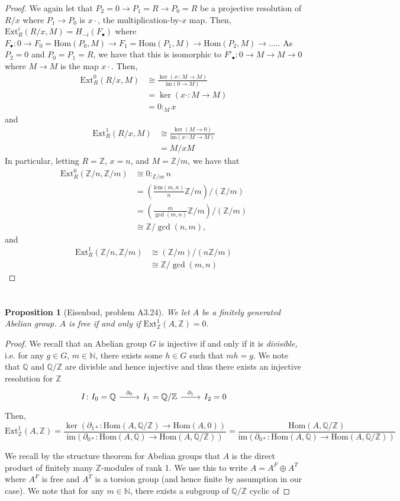 \documentclass[english]{article}
\newcommand{\NN}{\mathbb{N}}
\newcommand{\ZZ}{\mathbb{Z}}
\newcommand{\QQ}{\mathbb{Q}}
\newcommand{\prob}[1]{\setcounter{section}{#1-1}\section{}}
\newtheorem*{prop*}{Proposition}
\theoremstyle{remark}
\theoremstyle{definition}
\newcommand{\lcm}{\mathrm{lcm}}
\renewcommand{\hom}{\mathrm{Hom}}
\newcommand{\im}{\mathrm{im}}
\newcommand{\ext}{\mathrm{Ext}}
\newcommand{\col}[3]{{#1}:_{#2}{#3}}
\newcommand{\del}{\partial}
\begin{document}
\begin{proof}
	We again let that $P_2=0\to P_1=R\to P_0=R$ be a projective resolution of $R/x$ where $P_1\to P_0$ is $x\cdot$, the multiplication-by-$x$ map. Then, $\ext^i_R(R/x,M)=H_{-i}(F_\bullet)$ where $F_\bullet\colon0\to F_0=\hom(P_0,M)\to F_1=\hom(P_1,M)\to \hom(P_2,M)\to\hdots.$. As $P_2=0$ and $P_0=P_1=R$, we have that this is isomorphic to $F'_\bullet\colon0\to M\to M\to 0$ where $M\to M$ is the map $x\cdot$. Then, \begin{align*}\ext_R^0(R/x,M)&\cong\frac{\ker(x\cdot:M\to M)}{\im(0\to M)}\\&=\ker (x\cdot:M\to M)\\&= \col{0}{M}{x}\end{align*}
	and \begin{align*}
	\ext^1_R(R/x,M)&\cong \frac{\ker(M\to 0)}{\im(x\cdot:M\to M)}\\&=M/xM
	\end{align*}
	In particular, letting $R=\ZZ$, $x=n$, and $M=\ZZ/m$, we have that \begin{align*}
\ext_R^0(\ZZ/n,\ZZ/m)&\cong\col{0}{\ZZ/m}{n}\\&=\left(\frac{\lcm(m,n)}{n}\ZZ/m\right)/\left(\ZZ/m\right)\\&=\left(\frac{m}{\gcd(m,n)}\ZZ/m\right)/\left(\ZZ/m\right)\\&\cong \ZZ/\gcd(n,m),	\end{align*} and \begin{align*}
	\ext_R^1(\ZZ/n,\ZZ/m)&\cong (\ZZ/m)/\left(n\ZZ/m\right)\\&\cong \ZZ/\gcd(m,n)
\end{align*}
\end{proof}
%
%
%
\prob{34}\begin{prop*}[Eisenbud, problem A3.24]
	We let $A$ be a finitely generated Abelian group. $A$ is free if and only if $\ext_\ZZ^1(A,\ZZ)=0$.
\end{prop*}
\begin{proof}
We recall that an Abelian group $G$ is injective if and only if it is \textit{divisible,} i.e. for any $g\in G$, $m\in \NN$, there exists some $h\in G$ such that $mh=g$. We note that $\QQ$ and $\QQ/\ZZ$ are divisble and hence injective and thus there exists an injective resolution for $\ZZ$ \begin{equation*}
\begin{tikzcd}
	I\colon I_0=\QQ\arrow[r,"\del_0"]& I_1=\QQ/\ZZ\arrow[r,"\del_1"]&I_2=0\end{tikzcd}
\end{equation*}
Then, $$\ext^1_\ZZ(A,\ZZ)=\frac{\ker\left(\del_{1*}:\hom(A,\QQ/\ZZ)\to\hom(A,0)\right)}{\im\left(\del_{0*}:\hom(A,\QQ)\to\hom(A,\QQ/\ZZ)\right)}=\frac{\hom(A,\QQ/\ZZ)}{\im\left(\del_{0*}:\hom(A,\QQ)\to\hom(A,\QQ/\ZZ)\right)}$$

We recall by the structure theorem for Abelian groups that $A$ is the direct product of finitely many $\ZZ$-modules of rank 1. We use this to write $A=A^F\oplus A^T$ where $A^F$ is free and $A^T$ is a torsion group (and hence finite by assumption in our case). We note that for any $m\in \NN$, there exists a subgroup of $\QQ/\ZZ$ cyclic of 
\end{proof}

\printbibliography
\end{document}
